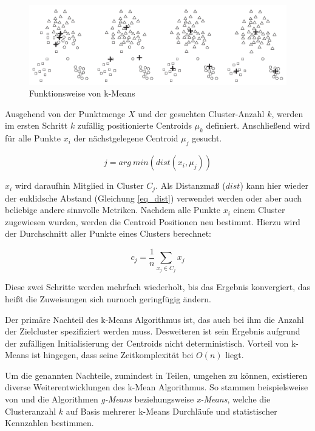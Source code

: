 \begin{figure}[H]
    \centering
    \includegraphics[width=0.9\linewidth]{../resources/img/grundlagen/k-means}
    \caption[Funktionsweise von k-Means]{Funktionsweise von k-Means \cite[]{tan2007introduction}}
    \label{fig:grund_kmeans_clustering}
\end{figure}

Ausgehend von der Punktmenge $X$ und der gesuchten Cluster-Anzahl $k$,
werden im ersten Schritt $k$ zufällig positionierte Centroids $\mu_k$ definiert.
Anschließend wird für alle Punkte $x_i$ der nächstgelegene Centroid $\mu_j$ gesucht.

\begin{equation}
    \label{eq_kmeans2}
    j = arg\ min(dist(x_i, \mu_j))
\end{equation}

$x_i$ wird daraufhin Mitglied in Cluster $C_j$. Als Distanzmaß ($dist$) kann hier wieder der euklidsche Abstand
(Gleichung \ref{eq_dist}) verwendet werden oder aber auch beliebige andere sinnvolle Metriken.
Nachdem alle Punkte $x_i$ einem Cluster zugewiesen wurden, werden die Centroid Positionen neu bestimmt.
Hierzu wird der Durchschnitt aller Punkte eines Clusters berechnet:

\begin{equation}
    \label{eq_kmeans3}
    c_j = \frac{1}{n} \sum_{x_j \in C_j} x_j
\end{equation}

Diese zwei Schritte werden mehrfach wiederholt, bis das Ergebnis konvergiert, das heißt die Zuweisungen sich
nurnoch geringfügig ändern. \cite[]{Jain2010}

Der primäre Nachteil des k-Means Algorithmus ist, das auch bei ihm die Anzahl der Zielcluster spezifiziert
werden muss. Desweiteren ist sein Ergebnis aufgrund der zufälligen Initialisierung der Centroids
nicht deterministisch. Vorteil von k-Means ist hingegen, dass seine Zeitkomplexität bei $O(n)$ liegt.

Um die genannten Nachteile, zumindest in Teilen, umgehen zu können, existieren diverse Weiterentwicklungen des k-Mean
Algorithmus. So stammen beispielsweise von \cite[]{Hamerly} und \cite[]{Pelleg} die Algorithmen \textit{g-Means}
beziehungsweise \textit{x-Means}, welche die Clusteranzahl $k$ auf Basis mehrerer k-Means Durchläufe und
statistischer Kennzahlen bestimmen.

